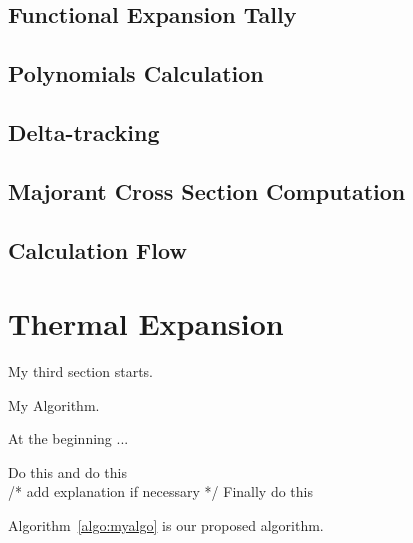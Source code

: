 \documentclass[11pt,a4paper,onecolumn,oneside]{report}
\begin{document}

\subsection{Functional Expansion Tally}
\subsection{Polynomials Calculation}
\subsection{Delta-tracking}
\subsection{Majorant Cross Section Computation}
\subsection{Calculation Flow}


\newpage 
\section{Thermal Expansion} 
My third section starts. 

\begin{algorithm}
	\caption{My Algorithm.} \label{algo:myalgo}
    At the beginning ...
    
	\begin{algorithmic}[1]	    
	    \STATE Do this
        \STATE and do this\\
        /* add explanation if necessary */
        \STATE Finally do this
	\end{algorithmic} 
\end{algorithm}
%
Algorithm~\ref{algo:myalgo} is our proposed algorithm.
\end{document}
